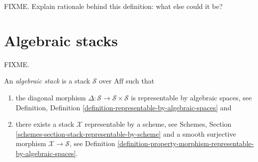 \noindent
FIXME. Explain rationale behind this definition: what else could it be?


\section{Algebraic stacks}
\label{section-algebraic-stacks}

\noindent
FIXME.

\begin{definition}
\label{definition-algebraic-stack}
An {\it algebraic stack}
is a stack $\mathcal{S}$ over $\text{Aff}$ such that
\begin{enumerate}
\item the diagonal morphism
$\Delta : \mathcal{S} \to \mathcal{S}\times\mathcal{S}$
is representable by algebraic spaces, see Definition,
Definition \ref{definition-representable-by-algebraic-spaces} and
\item there exists a stack $\mathcal{X}$ representable by a scheme, see
Schemes, Section \ref{schemes-section-stack-representable-by-scheme}
and a smooth surjective morphism $\mathcal{X} \to \mathcal{S}$,
see Definition
\ref{definition-property-morphism-representable-by-algebraic-spaces}.
\end{enumerate}
\end{definition}







